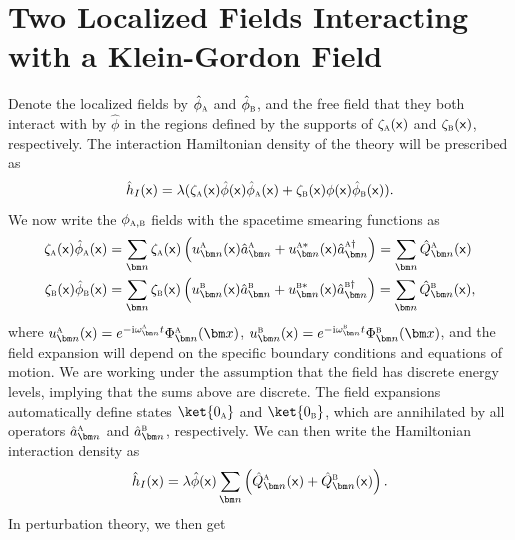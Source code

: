 \documentclass[letterpaper,12pt,titlepage,oneside,final]{book}
\newcommand{\mf}{\mathsf}%
\newcommand{\ii}{\mathrm{i}}
\newcommand{\tc}[1]{\textsc{#1}}
\begin{document}
{


\chapter{Two Localized Fields Interacting with a Klein-Gordon Field}\label{app:twoQFTs}

Denote the localized fields by $\hat{\phi}_\tc{a}$ and $\hat{\phi}_\tc{b}$, and the free field that they both interact with by $\hat{\phi}$ in the regions defined by the supports of $\zeta_\tc{a}(\mf x)$ and $\zeta_\tc{b}(\mf x)$, respectively. The interaction Hamiltonian density of the theory will be prescribed as
\begin{equation}
    \hat{h}_I(\mf x) = \lambda  (\zeta_\tc{a}(\mf x)\hat{\phi}(\mf x)\hat{\phi}_\tc{a}(\mf x) + \zeta_\tc{b}(\mf x)\phi(\mf x) \hat{\phi}_\tc{b}(\mf x)).
\end{equation}
We now write the $\phi_{\tc{a},\tc{b}}$ fields with the spacetime smearing functions as
\begin{align}
\zeta_\tc{a}(\mf x)\hat{\phi}_\tc{a}(\mf x) &= \sum_{\bm n} \zeta_\tc{a}(\mf x)\left( u_{\bm n}^{\tc{a}}(\mf x) \hat{a}_{\bm n}^\tc{a} +  u^{\tc{a}*}_{\bm n}(\mf x)\hat{a}^{\tc{a}\dagger}_{\bm n} \right) = \sum_{\bm n} \hat{Q}^{\tc{a}}_{\bm n}(\mf x)\\
\zeta_\tc{b}(\mf x)\hat{\phi}_\tc{b}(\mf x) &= \sum_{\bm n} \zeta_\tc{b}(\mf x)\left( u_{\bm n}^{\tc{b}}(\mf x) \hat{a}_{\bm n}^\tc{b} +  u^{\tc{b}*}_{\bm n}(\mf x) \hat{a}_{\bm n}^{\tc{b}\dagger} \right) = \sum_{\bm n}   \hat{Q}_{\bm n}^\tc{b}(\mf x),
\end{align}
where $u_{\bm n}^{\tc{a}}(\mf x) = e^{-\ii \omega_{\bm n}^{\tc{a}} t}\Phi^\tc{a}_{\bm n}(\bm x)$, $u_{\bm n}^{\tc{b}}(\mf x) = e^{-\ii \omega_{\bm n}^{\tc{b}} t}\Phi_{\bm n}^{\tc{b}}(\bm x)$, and the field expansion will depend on the specific boundary conditions and equations of motion. We are working under the assumption that the field has discrete energy levels, implying that the sums above are discrete. The field expansions automatically define states $\ket{0_\tc{a}}$ and $\ket{0_\tc{b}}$, which are annihilated by all operators $\hat{a}_{\bm n}^\tc{a}$ and $\hat{a}_{\bm n}^\tc{b}$, respectively. We can then write the Hamiltonian interaction density as
\begin{equation}
    \hat{h}_I(\mf x) = \lambda\hat{\phi}(\mf x) \sum_{\bm n} \left(\hat{Q}_{\bm n}^{\tc{a}}(\mf x) +  \hat{Q}_{\bm n}^\tc{b}(\mf x)\right).
\end{equation}
In perturbation theory, we then get
}
\end{document}
